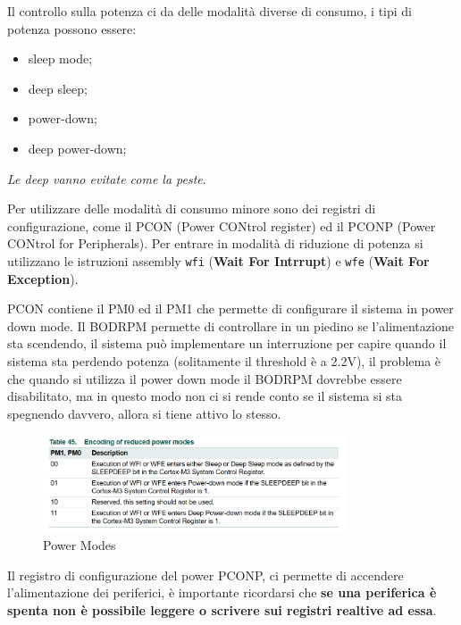\documentclass[12pt]{article}
\begin{document}
Il controllo sulla potenza ci da delle modalit\`a diverse di consumo, i tipi di potenza possono essere:
\begin{itemize}
    \item sleep mode;
    \item deep sleep;
    \item power-down;
    \item deep power-down;
\end{itemize}
\emph{Le deep vanno evitate come la peste}.

Per utilizzare delle modalit\`a di consumo minore sono dei registri di configurazione, come il PCON (Power CONtrol register) ed il PCONP (Power CONtrol for Peripherals). Per entrare in modalit\`a di riduzione di potenza si utilizzano le istruzioni assembly \texttt{wfi} (\textbf{Wait For Intrrupt}) e \texttt{wfe} (\textbf{Wait For Exception}).

PCON contiene il PM0 ed il PM1 che permette di configurare il sistema in power down mode. Il BODRPM permette di controllare in un piedino se l'alimentazione sta scendendo, il sistema pu\`o implementare un interruzione per capire quando il sistema sta perdendo potenza (solitamente il threshold \`e a 2.2V), il problema \`e che quando si utilizza il power down mode il BODRPM dovrebbe essere disabilitato, ma in questo modo non ci si rende conto se il sistema si sta spegnendo davvero, allora si tiene attivo lo stesso.
\begin{figure}[H]
    \centering
    \includegraphics[width=0.8\textwidth]{power-modes.png}
    \caption{Power Modes}
    \label{fig:power-modes}
\end{figure}
Il registro di configurazione del power PCONP, ci permette di accendere l'alimentazione dei periferici, \`e importante ricordarsi che \textbf{se una periferica \`e spenta non \`e possibile leggere o scrivere sui registri realtive ad essa}.
\end{document}
